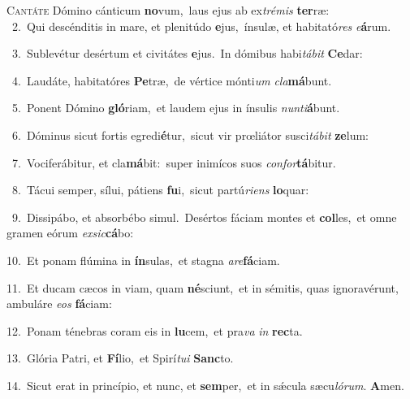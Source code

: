 \lettrine{\initial\textcolor{\initialcolor}{C}}{antáte} Dómino cánticum \textbf{no}\-vum,~\star laus ejus ab ex\-\textit{tré}\-\textit{mis} \textbf{ter}\-ræ:\\
{\numbfont\textcolor{\numbcolor}{~2.}}~Qui descénditis in mare, et plenitúdo \textbf{e}\-jus,~\star ínsulæ, et habitató\textit{res} \textit{e}\-\textbf{á}rum.\par
{\numbfont\textcolor{\numbcolor}{~3.}}~Sublevétur desértum et civitátes \textbf{e}\-jus.~\star In dómibus habi\-\textit{tá}\-\textit{bit} \textbf{Ce}\-dar:\par
{\numbfont\textcolor{\numbcolor}{~4.}}~Laudáte, habitatóres \textbf{Pe}\-træ,~\star de vértice mónti\textit{um} \textit{cla}\-\textbf{má}bunt.\par
{\numbfont\textcolor{\numbcolor}{~5.}}~Ponent Dómino \textbf{gló}\-riam,~\star et laudem ejus in ínsulis \textit{nun}\-\textit{ti}\textbf{á}bunt.\par
{\numbfont\textcolor{\numbcolor}{~6.}}~Dóminus sicut fortis egredi\-\textbf{é}\-tur,~\star sicut vir prœliátor susci\-\textit{tá}\-\textit{bit} \textbf{ze}\-lum:\par
{\numbfont\textcolor{\numbcolor}{~7.}}~Vociferábitur, et cla\-\textbf{má}\-bit:~\star super inimícos suos \textit{con}\-\textit{for}\textbf{tá}bitur.\par
{\numbfont\textcolor{\numbcolor}{~8.}}~Tácui semper, sílui, pátiens \textbf{fu}\-i,~\star sicut partú\-\textit{ri}\-\textit{ens} \textbf{lo}\-quar:\par
{\numbfont\textcolor{\numbcolor}{~9.}}~Dissipábo, et absorbébo simul.~\dagger Desértos fáciam montes et \textbf{col}\-les,~\star et omne gramen eórum \textit{ex}\-\textit{sic}\textbf{cá}bo:\par
{\numbfont\textcolor{\numbcolor}{10.}}~Et ponam flúmina in \textbf{ín}\-sulas,~\star et stagna \textit{a}\-\textit{re}\textbf{fá}ciam.\par
{\numbfont\textcolor{\numbcolor}{11.}}~Et ducam cæcos in viam, quam \textbf{né}\-sciunt,~\star et in sémitis, quas ignoravérunt, ambuláre \textit{e}\-\textit{os} \textbf{fá}\-ciam:\par
{\numbfont\textcolor{\numbcolor}{12.}}~Ponam ténebras coram eis in \textbf{lu}\-cem,~\star et pra\textit{va} \textit{in} \textbf{rec}\-ta.\par
{\numbfont\textcolor{\numbcolor}{13.}}~Glória Patri, et \textbf{Fí}\-lio,~\star et Spirí\-\textit{tu}\-\textit{i} \textbf{Sanc}\-to.\par
{\numbfont\textcolor{\numbcolor}{14.}}~Sicut erat in princípio, et nunc, et \textbf{sem}\-per,~\star et in sǽcula sæcu\-\textit{ló}\-\textit{rum}. \textbf{A}\-men.\par
